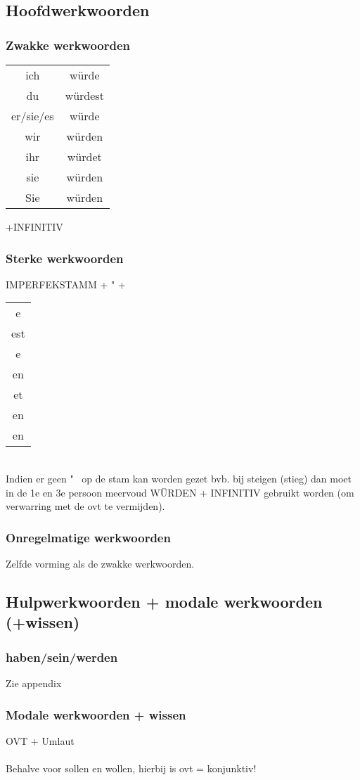 \documentclass[main.tex]{subfiles}
\begin{document}
\subsection{Hoofdwerkwoorden}
\subsubsection{Zwakke werkwoorden}
\begin{tabular}{cc}

ich & würde \\ 

du & würdest \\ 

er/sie/es & würde \\ 

wir & würden \\ 

ihr & würdet \\ 
 
sie & würden \\ 
Sie & würden  
\end{tabular} 
+INFINITIV
\subsubsection{Sterke werkwoorden}
IMPERFEKSTAMM + " +
\begin{tabular}{c} 
					e\\
					est\\
					e\\
					en\\
					et\\
					en\\
					en\\
									
					
\end{tabular}\\
Indien er geen " \ op de stam kan worden gezet bvb. bij steigen (stieg) dan moet in de 1e en 3e persoon meervoud WÜRDEN + INFINITIV gebruikt worden (om verwarring met de ovt te vermijden).
\subsubsection{Onregelmatige werkwoorden}
Zelfde vorming als de zwakke werkwoorden.
\subsection{Hulpwerkwoorden + modale werkwoorden (+wissen)}
\subsubsection{haben/sein/werden}
Zie appendix
\subsubsection{Modale werkwoorden + wissen}
OVT + Umlaut\\
\\
Behalve voor sollen en wollen, hierbij is ovt = konjunktiv!
\end{document}
